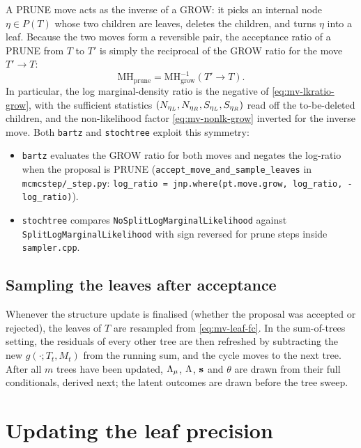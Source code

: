 A PRUNE move acts as the inverse of a GROW: it picks an internal node
$\eta \in P(T)$ whose two children are leaves, deletes the children, and
turns $\eta$ into a leaf. Because the two moves form a reversible pair, the
acceptance ratio of a PRUNE from $T$ to $T'$ is simply the reciprocal of the
GROW ratio for the move $T' \to T$:
\begin{equation}
	\label{eq:mv-mh-prune}
	\mathrm{MH}_{\mathrm{prune}}
	= \mathrm{MH}_{\mathrm{grow}}^{ -1}(T' \to T).
\end{equation}
In particular, the log marginal-density ratio is the negative of
\eqref{eq:mv-lkratio-grow}, with the sufficient statistics
$(N_{\eta_L}, N_{\eta_R}, S_{\eta_L}, S_{\eta_R})$ read off the
to-be-deleted children, and the non-likelihood factor
\eqref{eq:mv-nonlk-grow} inverted for the inverse move. Both \texttt{bartz} and \texttt{stochtree}
exploit this symmetry:
\begin{itemize}
	\item \texttt{bartz} evaluates the GROW ratio for both moves and negates
	      the log-ratio when the proposal is PRUNE
	      (\texttt{accept\_move\_and\_sample\_leaves} in
	      \texttt{mcmcstep/\_step.py}: \texttt{log\_ratio = jnp.where(pt.move.grow,
		      log\_ratio, -log\_ratio)}).
	\item \texttt{stochtree} compares
	      \texttt{NoSplitLogMarginalLikelihood} against
	      \texttt{SplitLogMarginalLikelihood} with sign reversed for prune
	      steps inside \texttt{sampler.cpp}.
\end{itemize}

\subsection{Sampling the leaves after acceptance}
\label{sec:mv-sample-leaves}

Whenever the structure update is finalised (whether the proposal was
accepted or rejected), the leaves of $T$ are resampled from
\eqref{eq:mv-leaf-fc}. In the sum-of-trees setting, the residuals of every
other tree are then refreshed by subtracting the new
$g(\cdot;  T_t, M_t)$ from the running sum, and the cycle moves to the
next tree. After all $m$ trees have been updated, $\Lambda_{\mu}$, $\Lambda$,
$\mathbf{s}$ and $\theta$ are drawn from their full conditionals, derived next; the
latent outcomes are drawn before the tree sweep.

\section{Updating the leaf precision}
\label{sec:mv-Lamm}

